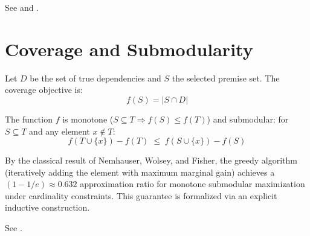 \documentclass[11pt,openany]{report}
\begin{document}
See  and
.

\section{Coverage and Submodularity}

Let $D$ be the set of true dependencies and $S$ the selected premise set.
The coverage objective is:
\[
  f(S) = |S \cap D|
\]

\begin{theorem}
\label{thm:coverage-submod}
The function $f$ is monotone ($S \subseteq T \Rightarrow f(S) \le f(T)$)
and submodular: for $S \subseteq T$ and any element $x \notin T$:
\[
  f(T \cup \{x\}) - f(T) \;\le\; f(S \cup \{x\}) - f(S)
\]
\end{theorem}

By the classical result of Nemhauser, Wolsey, and Fisher, the greedy
algorithm (iteratively adding the element with maximum marginal gain)
achieves a $(1 - 1/e) \approx 0.632$ approximation ratio for monotone
submodular maximization under cardinality constraints.  This guarantee
is formalized via an explicit  inductive construction.

See .
\end{document}
